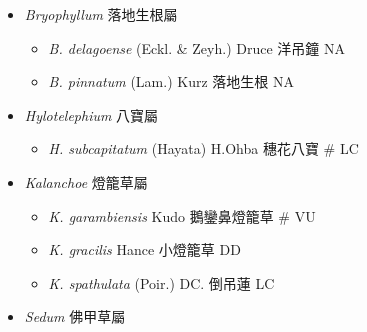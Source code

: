 
  \begin{itemize}
 \item[] \textit{Bryophyllum} 落地生根屬
                                
  \begin{itemize}
        \item[] \textit{B. delagoense} (Eckl. \& Zeyh.) Druce  洋吊鐘   NA
        \item[] \textit{B. pinnatum} (Lam.) Kurz  落地生根   NA
  \end{itemize}
 \item[] \textit{Hylotelephium} 八寶屬
                                
  \begin{itemize}
        \item[] \textit{H. subcapitatum} (Hayata) H.Ohba  穗花八寶  \# LC
  \end{itemize}
 \item[] \textit{Kalanchoe} 燈籠草屬
                                
  \begin{itemize}
        \item[] \textit{K. garambiensis} Kudo  鵝鑾鼻燈籠草  \# VU
        \item[] \textit{K. gracilis} Hance  小燈籠草   DD
        \item[] \textit{K. spathulata} (Poir.) DC.  倒吊蓮   LC
  \end{itemize}
 \item[] \textit{Sedum} 佛甲草屬
                                

\end{itemize}
